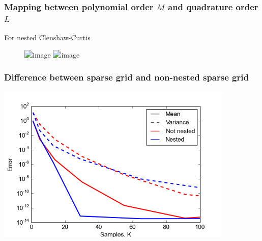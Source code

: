 \documentclass{beamer}
\begin{document}
  \begin{frame}
   \frametitle{Mapping between polynomial order $M$ and quadrature order $L$}
   For nested Clenshaw-Curtis
   \begin{figure}
    \includegraphics<1>[width=0.85\textwidth]{LvsM1.png}
    \includegraphics<2>[width=0.85\textwidth]{LvsM.png}
   \end{figure}



  \end{frame}



  \begin{frame}
 \frametitle{Difference between sparse grid and non-nested sparse grid}
 \begin{center}
                 \includegraphics[width=0.85\textwidth]{convergence_2D_L_sparse.png}

          \end{center}
%
%
%
\end{frame}
\end{document}
